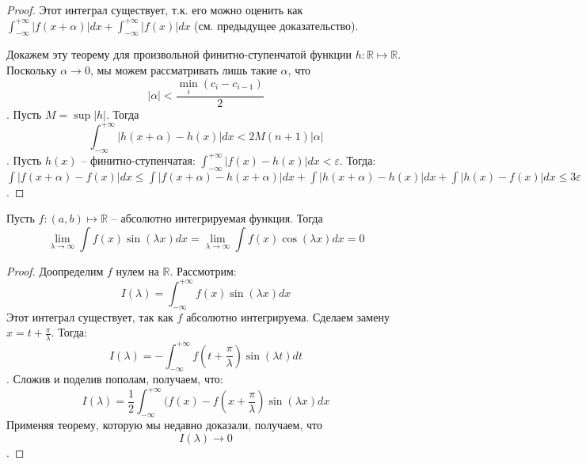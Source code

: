 \documentclass[document.tex]{subfiles}
\begin{document}
\begin{proof}
Этот интеграл существует, т.к. его можно оценить как $\int_{-\infty}^{+\infty}|f(x+\alpha)|dx + \int_{-\infty}^{+\infty}|f(x)|dx$ (см. предыдущее доказательство).

Докажем эту теорему для произвольной финитно-ступенчатой функции $h: \mathbb{R} \mapsto \mathbb{R}$. Поскольку $\alpha \rightarrow 0$, мы можем рассматривать лишь такие $\alpha$, что $$|\alpha| < \frac{\min_i (c_i - c_{i-1})}{2}$$. Пусть $M = \sup |h|$. Тогда 
$$\int_{-\infty}^{+\infty} |h(x + \alpha) - h(x)|dx < 2M(n+1)|\alpha|$$. Пусть $h(x)$ -- финитно-ступенчатая: $\int_{-\infty}^{+\infty}|f(x) - h(x)|dx < \varepsilon$. Тогда:
$\int |f(x+\alpha) - f(x)|dx \leq \int|f(x+\alpha)-h(x+\alpha)|dx + \int|h(x+\alpha)-h(x)|dx + \int|h(x)-f(x)|dx \leq 3\varepsilon$.
\end{proof}

\begin{lemma}
Пусть $f : (a, b) \mapsto \mathbb{R}$ -- абсолютно интегрируемая функция. Тогда 
$$\lim_{\lambda \rightarrow \infty} \int f(x)\sin (\lambda x)dx = \lim_{\lambda \rightarrow \infty} \int f(x)\cos (\lambda x)dx = 0$$
\end{lemma}
\begin{proof}
Доопределим $f$ нулем на $\mathbb{R}$. Рассмотрим:
$$I(\lambda) = \int_{-\infty}^{+\infty}f(x)\sin(\lambda x)dx$$
Этот интеграл существует, так как $f$ абсолютно интегрируема. Сделаем замену $x = t + \frac{\pi}{\lambda}$.
Тогда:
$$I(\lambda) = -\int_{-\infty}^{+\infty}f(t + \frac{\pi}{\lambda})\sin(\lambda t)dt$$.
Сложив и поделив пополам, получаем, что:
$$I(\lambda) = \frac{1}{2} \int_{-\infty}^{+\infty}(f(x) - f(x+\frac{\pi}{\lambda})\sin(\lambda x)dx$$
Применяя теорему, которую мы недавно доказали, получаем, что $$I(\lambda) \rightarrow 0$$.
\end{proof}
\end{document}
